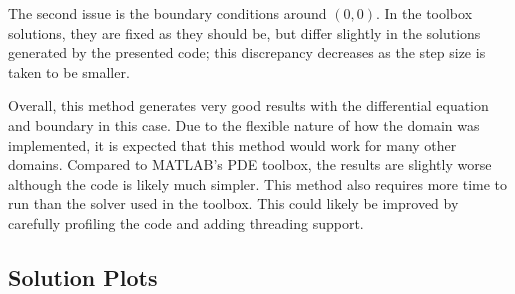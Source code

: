 \documentclass[10pt,a4paper]{article}
\begin{document}
The second issue is the boundary conditions around $(0, 0)$. In the toolbox solutions, they are fixed as they should be, but  differ slightly in the solutions generated by the presented code; this discrepancy decreases as the step size is taken to be smaller.

Overall, this method generates very good results with the differential equation and boundary in this case. Due to the flexible nature of how the domain was implemented, it is expected that this method would work for many other domains. Compared to MATLAB's PDE toolbox, the results are slightly worse although the code is likely much simpler. This method also requires more time to run than the solver used in the toolbox. This could likely be improved by carefully profiling the code and adding threading support.


\pagebreak
\subsection*{Solution Plots}
\end{document}
